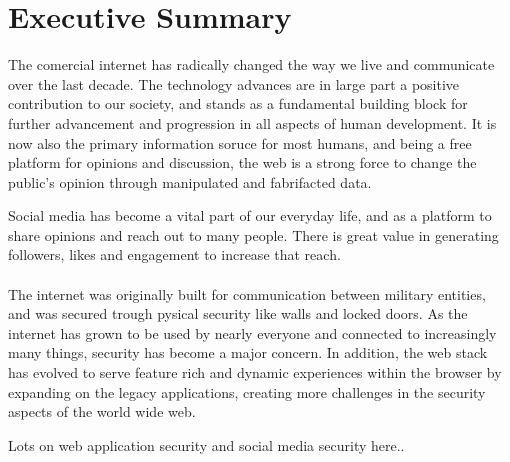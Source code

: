 \section*{Executive Summary}
The comercial internet has radically changed the way we live and communicate over the last decade. The technology advances are in large part a positive contribution to our society, and stands as a fundamental building block for further advancement and progression in all aspects of human development. It is now also the primary information soruce for most humans, and being a free platform for opinions and discussion, the web is a strong force to change the public's opinion through manipulated and fabrifacted data. 

Social media has become a vital part of our everyday life, and as a platform to share opinions and reach out to many people. There is great value in generating followers, likes and engagement to increase that reach.
\\ \\

The internet was originally built for communication between military entities, and was secured trough pysical security like walls and locked doors. As the internet has grown to be used by nearly everyone and connected to increasingly many things, security has become a major concern. In addition, the web stack has evolved to serve feature rich and dynamic experiences within the browser by expanding on the legacy applications, creating more challenges in the security aspects of the world wide web.

Lots on web application security and social media security here..
	


